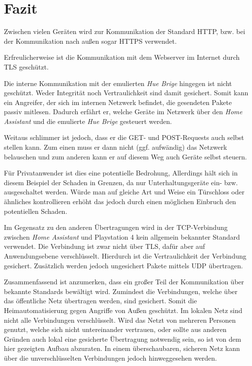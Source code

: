\newpage

\section{Fazit}\label{sec:fazit}

Zwischen vielen Geräten wird zur Kommunikation der Standard HTTP,
bzw. bei der Kommunikation nach außen sogar HTTPS verwendet.

Erfreulicherweise ist die Kommunikation mit dem Webserver im Internet durch TLS geschützt.

Die interne Kommunikation mit der emulierten \textit{Hue Brige} hingegen ist nicht geschützt.
Weder Integrität noch Vertraulichkeit sind damit gesichert.
Somit kann ein Angreifer, der sich im internen Netzwerk befindet,
die gesendeten Pakete passiv mitlesen.
Dadurch erfährt er,
welche Geräte im Netzwerk über den \textit{Home Assistant} und die emulierte \textit{Hue Brige} gesteuert werden.

Weitaus schlimmer ist jedoch, dass er die GET- und POST-Requests auch selbst stellen kann.
Zum einen muss er dann nicht (ggf. aufwändig) das Netzwerk belauschen
und zum anderen kann er auf diesem Weg auch Geräte selbst steuern.

Für Privatanwender ist dies eine potentielle Bedrohung,
Allerdings hält sich in diesem Beispiel der Schaden in Grenzen, da nur Unterhaltungsgeräte ein- bzw. ausgeschaltet werden.
Würde man auf gleiche Art und Weise ein Türschloss oder ähnliches kontrollieren erhöht das jedoch durch einen
möglichen Einbruch den potentiellen Schaden.

Im Gegensatz zu den anderen Übertragungen wird
in der TCP-Verbindung zwischen \textit{Home Assistant} und Playstation 4 kein allgemein bekannter Standard verwendet.
Die Verbindung ist zwar nicht über TLS, dafür aber auf Anwendungsebene verschlüsselt.
Hierdurch ist die Vertraulichkeit der Verbindung gesichert.
Zusätzlich werden jedoch ungesichert Pakete mittels UDP übertragen.

Zusammenfassend ist anzumerken,
dass ein großer Teil der Kommunikation über bekannte Standards bewältigt wird.
Zumindest die Verbindungen, welche über das öffentliche Netz übertragen werden, sind gesichert.
Somit die Heimautomatisierung gegen Angriffe von Außen geschützt.
Im lokalen Netz sind nicht alle Verbindungen verschlüsselt.
Wird das Netzt von mehreren Personen genutzt, welche sich nicht untereinander vertrauen,
oder sollte aus anderen Gründen auch lokal eine gesicherte Übertragung notwendig sein,
so ist von dem hier gezeigten Aufbau abzuraten.
In einem überschaubaren, sicheren Netz kann über die unverschlüsselten Verbindungen jedoch hinweggesehen werden.